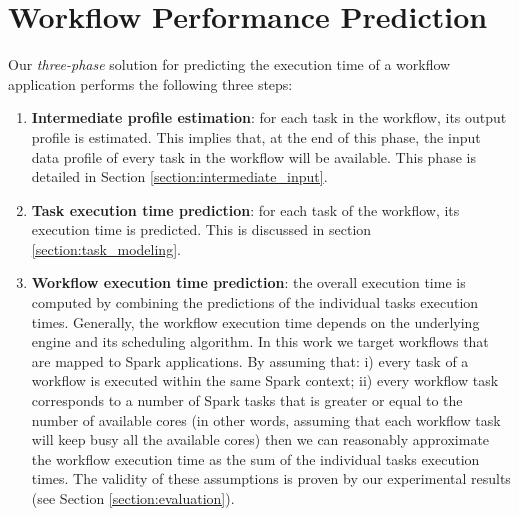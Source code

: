 \documentclass[a4paper, 10pt, conference]{ieeeconf}      %
\begin{document}

\section{Workflow Performance Prediction}
\label{section:performance_prediction}
Our \textit{three-phase} solution for predicting the execution time of a workflow application performs
the following three steps:
\begin{enumerate}
    \item \textbf{Intermediate profile estimation}: for each task in the workflow, its output profile is estimated. This implies that, at the end of this phase, the input data profile of every task in the workflow will be available.  This phase is detailed in Section \ref{section:intermediate_input}.
    \item \textbf{Task execution time prediction}: for each task of the workflow, its execution time is predicted. This is discussed in section \ref{section:task_modeling}.
     \item \textbf{Workflow execution time prediction}: the overall execution time is computed by combining the predictions of the individual tasks execution times. Generally, the workflow execution time depends on the underlying engine and its scheduling algorithm. In this work we target workflows that are mapped to Spark applications. By assuming that: i) every task of a workflow is executed within the same Spark context; ii) every workflow task corresponds to a number of Spark tasks that is greater or equal to the number of available cores (in other words,  assuming that each workflow task will keep busy all the available cores) then we can reasonably approximate the workflow  execution time as the sum of the individual tasks execution times. The validity of these assumptions is proven by our experimental results (see Section \ref{section:evaluation}).
\end{enumerate}
\end{document}
